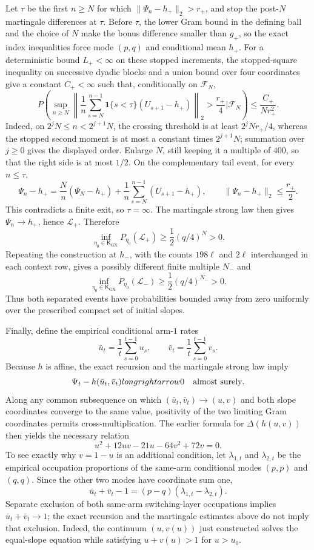 Let \(\tau\) be the first \(n\ge N\) for which \(\|\Psi_n-h_+\|_2>r_+\), and stop the post-\(N\) martingale differences at \(\tau\).  Before \(\tau\), the lower Gram bound in the defining ball and the choice of \(N\) make the bonus difference smaller than \(g_+\), so the exact index inequalities force mode \((p,q)\) and conditional mean \(h_+\).  For a deterministic bound \(L_+<\infty\) on these stopped increments, the stopped-square inequality on successive dyadic blocks and a union bound over four coordinates give a constant \(C_+<\infty\) such that, conditionally on \(\mathcal F_N\),
\[
 P\!\left(
 \sup_{n\ge N}\left\|
 \frac1n\sum_{s=N}^{n-1}
 \mathbf1\{s<\tau\}(U_{s+1}-h_+)
 \right\|_2>\frac{r_+}{4}
 \mathrel{\Big|}\mathcal F_N\right)
 \le\frac{C_+}{Nr_+^2}.
\]
Indeed, on \(2^jN\le n<2^{j+1}N\), the crossing threshold is at least \(2^jNr_+/4\), whereas the stopped second moment is at most a constant times \(2^{j+1}N\); summation over \(j\ge0\) gives the displayed order.  Enlarge \(N\), still keeping it a multiple of \(400\), so that the right side is at most \(1/2\).  On the complementary tail event, for every \(n\le\tau\),
\[
 \Psi_n-h_+
 =\frac{N}{n}(\Psi_N-h_+)
 +\frac1n\sum_{s=N}^{n-1}(U_{s+1}-h_+),
 \qquad
 \|\Psi_n-h_+\|_2\le\frac{r_+}{2}.
\]
This contradicts a finite exit, so \(\tau=\infty\).  The martingale strong law then gives \(\Psi_n\to h_+\), hence \(\mathcal L_+\).  Therefore
\[
 \inf_{\eta_0\in\mathsf K_{\mathrm{GX}}}
 P_{\eta_0}(\mathcal L_+)
 \ge\frac12(q/4)^N>0.
\]
Repeating the construction at \(h_-\), with the counts \(198\ell\) and \(2\ell\) interchanged in each context row, gives a possibly different finite multiple \(N_-\) and
\[
 \inf_{\eta_0\in\mathsf K_{\mathrm{GX}}}
 P_{\eta_0}(\mathcal L_-)
 \ge\frac12(q/4)^{N_-}>0.
\]
Thus both separated events have probabilities bounded away from zero uniformly over the prescribed compact set of initial slopes.

Finally, define the empirical conditional arm-\(1\) rates
\[
 \bar u_t=\frac1t\sum_{s=0}^{t-1}u_s,
 \qquad
 \bar v_t=\frac1t\sum_{s=0}^{t-1}v_s.
\]
Because \(h\) is affine, the exact recursion and the martingale strong law imply
\[
 \Psi_t-h(\bar u_t,\bar v_t)longrightarrow0
 \quad\hbox{almost surely}.
\]
Along any common subsequence on which \((\bar u_t,\bar v_t)\to(u,v)\) and both slope coordinates converge to the same value, positivity of the two limiting Gram coordinates permits cross-multiplication.  The earlier formula for \(\Delta(h(u,v))\) then yields the necessary relation
\[
 u^2+12uv-21u-64v^2+72v=0.
\]
To see exactly why \(v=1-u\) is an additional condition, let \(\lambda_{1,t}\) and \(\lambda_{2,t}\) be the empirical occupation proportions of the same-arm conditional modes \((p,p)\) and \((q,q)\).  Since the other two modes have coordinate sum one,
\[
 \bar u_t+\bar v_t-1=(p-q)(\lambda_{1,t}-\lambda_{2,t}).
\]
Separate exclusion of both same-arm switching-layer occupations implies \(\bar u_t+\bar v_t\to1\); the exact recursion and the martingale estimates above do not imply that exclusion.  Indeed, the continuum \((u,v(u))\) just constructed solves the equal-slope equation while satisfying \(u+v(u)>1\) for \(u>u_0\).

